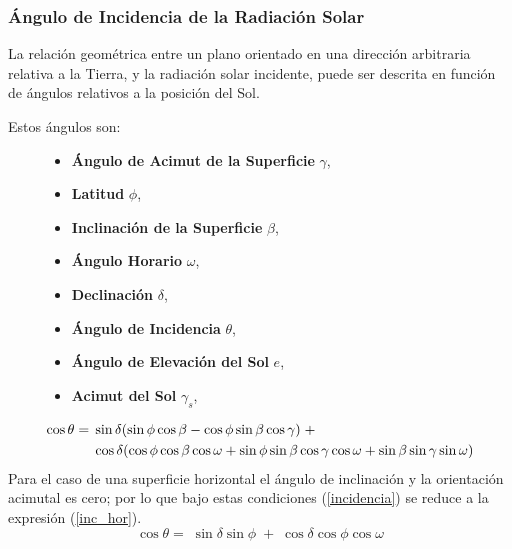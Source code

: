 \documentclass{beamer}
\begin{document}
\begin{frame}
   \frametitle{Ángulo de Incidencia de la Radiación Solar}
   \scriptsize La relación geométrica entre un plano orientado en una dirección arbitraria relativa
   a la Tierra, y la radiación solar incidente, puede ser descrita en función de ángulos
   relativos a la posición del Sol. \par
   Estos ángulos son:\par
   \begin{figure}
   \begin{minipage}{0.5\textwidth} 
   \begin{itemize}
      \item \textbf{Ángulo de Acimut de la Superficie} $\gamma$, 
      \item \textbf{Latitud} $\phi$,
      \item \textbf{Inclinación de la Superficie} $\beta$,
      \item \textbf{Ángulo Horario} $\omega$,
   \end{itemize}
   \end{minipage}
   \begin{minipage}{0.4\textwidth}
      \begin{itemize}
         \item \textbf{Declinación} $\delta$,
         \item \textbf{Ángulo de Incidencia} $\theta$,
         \item \textbf{Ángulo de Elevación del Sol} $e$,
         \item \textbf{Acimut del Sol} $\gamma_s$,
      \end{itemize}
   \end{minipage}
   \end{figure}

   \begin{align}
     \notag
     \label{incidencia}
     \cos\theta = & \; \sin\delta (\sin\phi \cos\beta - \cos\phi \sin\beta \cos\gamma) \; + \; \\
     & \; \cos\delta(\cos\phi \cos\beta \cos\omega + \sin\phi \sin\beta \cos\gamma
       \cos\omega + \sin\beta \sin\gamma \sin\omega)
   \end{align} 
   Para el caso de una superficie horizontal el ángulo de inclinación y la orientación acimutal es cero; por lo
   que bajo estas condiciones (\ref{incidencia}) se reduce a la expresión (\ref{inc_hor}).
   \begin{equation}
     \label{inc_hor}
     \cos\theta = \; \sin\delta\sin\phi \; + \; \cos\delta\cos\phi\cos\omega
   \end{equation}   
\end{frame}
\end{document}
